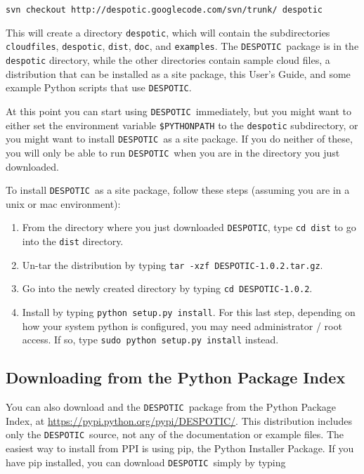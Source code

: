 \documentclass[12pt]{article}
\newcommand{\despotic}{\texttt{DESPOTIC}}
\begin{document}
\begin{verbatim}
svn checkout http://despotic.googlecode.com/svn/trunk/ despotic
\end{verbatim}

This will create a directory \verb=despotic=, which will contain the subdirectories \verb=cloudfiles=, \verb=despotic=, \verb=dist=, \verb=doc=, and \verb=examples=. The \despotic\ package is in the \verb=despotic= directory, while the other directories contain sample cloud files, a distribution that can be installed as a site package, this User's Guide, and some example Python scripts that use \despotic.

At this point you can start using \despotic\ immediately, but you might want to either set the environment variable \verb=$PYTHONPATH= to the \verb=despotic= subdirectory, or you might want to install \despotic\ as a site package. If you do neither of these, you will only be able to run \despotic\ when you are in the directory you just downloaded.

To install \despotic\ as a site package, follow these steps (assuming you are in a unix or mac environment):
\begin{enumerate}
\item From the directory where you just downloaded \despotic, type \verb=cd dist= to go into the \verb=dist= directory.
\item Un-tar the distribution by typing \verb=tar -xzf DESPOTIC-1.0.2.tar.gz=.
\item Go into the newly created directory by typing \verb=cd DESPOTIC-1.0.2=.
\item Install by typing \verb=python setup.py install=. For this last step, depending on how your system python is configured, you may need administrator / root access. If so, type \verb=sudo python setup.py install= instead.
\end{enumerate}

\subsection{Downloading from the Python Package Index}

You can also download and the \despotic\ package from the Python Package Index, at \url{https://pypi.python.org/pypi/DESPOTIC/}. This distribution includes only the \despotic\ source, not any of the documentation or example files. The easiest way to install from PPI is using pip, the Python Installer Package. If you have pip installed, you can download \despotic\ simply by typing
\end{document}
